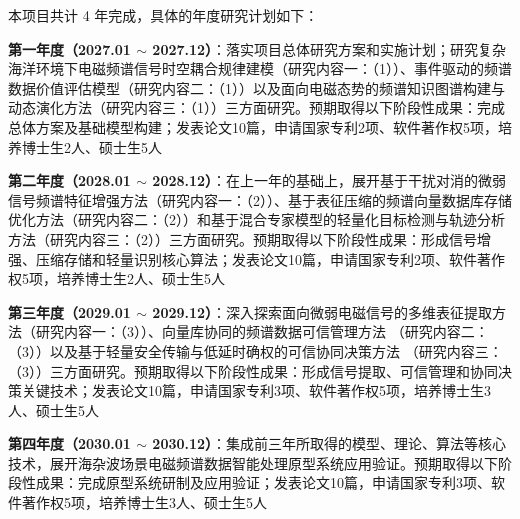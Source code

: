 {\kaishu
	
	本项目共计 4 年完成，具体的年度研究计划如下：
	
	\textbf{第一年度（2027.01 $\sim$ 2027.12）}：落实项目总体研究方案和实施计划；研究复杂海洋环境下电磁频谱信号时空耦合规律建模（研究内容一：（1））、事件驱动的频谱数据价值评估模型（研究内容二：（1））以及面向电磁态势的频谱知识图谱构建与动态演化方法（研究内容三：（1））三方面研究。预期取得以下阶段性成果：完成总体方案及基础模型构建；发表论文10篇，申请国家专利2项、软件著作权5项，培养博士生2人、硕士生5人
	
	\textbf{第二年度（2028.01 $\sim$ 2028.12）}：在上一年的基础上，展开基于干扰对消的微弱信号频谱特征增强方法（研究内容一：（2））、基于表征压缩的频谱向量数据库存储优化方法（研究内容二：（2））和基于混合专家模型的轻量化目标检测与轨迹分析方法（研究内容三：（2））三方面研究。预期取得以下阶段性成果：形成信号增强、压缩存储和轻量识别核心算法；发表论文10篇，申请国家专利2项、软件著作权5项，培养博士生2人、硕士生5人
	
	\textbf{第三年度（2029.01 $\sim$ 2029.12）}：深入探索面向微弱电磁信号的多维表征提取方法（研究内容一：（3））、向量库协同的频谱数据可信管理方法
	（研究内容二：（3））以及基于轻量安全传输与低延时确权的可信协同决策方法
	（研究内容三：（3））三方面研究。预期取得以下阶段性成果：形成信号提取、可信管理和协同决策关键技术；发表论文10篇，申请国家专利3项、软件著作权5项，培养博士生3人、硕士生5人
	
	\textbf{第四年度（2030.01 $\sim$ 2030.12）}：集成前三年所取得的模型、理论、算法等核心技术，展开海杂波场景电磁频谱数据智能处理原型系统应用验证。预期取得以下阶段性成果：完成原型系统研制及应用验证；发表论文10篇，申请国家专利3项、软件著作权5项，培养博士生3人、硕士生5人
}
